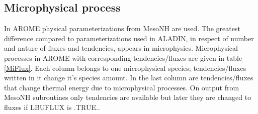 \subsection{Microphysical process}
In AROME physical parameterizations from MesoNH are used. The greatest difference compared to parameterizations used in ALADIN, in respect of number and nature of fluxes and tendencies, appears in microphysics.  Microphysical processes in AROME with corresponding tendencies/fluxes are given in table \ref{MiFlux}. Each column belongs to one microphysical species; tendencies/fluxes written in it change it's species amount. In the last column are tendencies/fluxes that change thermal energy due to microphysical processes. On output from MesoNH subroutines only tendencies are available but later they are changed to fluxes if LBUFLUX is .TRUE.. 

